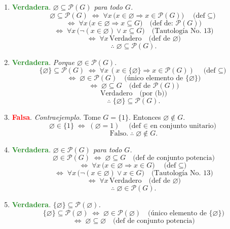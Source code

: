 \documentclass[12pt,letterpaper]{exam}
\begin{document}
\begin{enumerate}
\begin{enumerate}[label=\alph*)]
\item \textbf{\textcolor{ForestGreen}{Verdadera}}. \textit{$\varnothing \subseteq \mathcal{P}(G)$ para todo $G$.}
\[
\varnothing\subseteq \mathcal{P}(G)
\;\iff\; \forall x\,\big(x\in\varnothing \Rightarrow x\in \mathcal{P}(G)\big)
\quad\text{(def $\subseteq$)}
\]
\[
\iff\; \forall x\,\big(x\in\varnothing \Rightarrow x\subseteq G\big)
\quad\text{(def de: \(\mathcal{P}(G)\))}
\]
\[
\iff\; \forall x\,\big(\lnot(x\in\varnothing)\lor x\subseteq G\big)
\quad\text{(Tautología No.\ 13)}
\]
\[
\iff\; \forall x\,\text{Verdadero}
\quad\text{(def de $\varnothing$)}
\]
\[
\therefore\; \varnothing\subseteq \mathcal{P}(G).
\]
\item \textbf{\textcolor{ForestGreen}{Verdadera}}. \textit{Porque \(\varnothing\in\mathcal{P}(G)\)}.
\[
\{\varnothing\}\subseteq \mathcal{P}(G)
\;\iff\; \forall x\,(x\in\{\varnothing\}\Rightarrow x\in \mathcal{P}(G)) \quad\text{(def $\subseteq$)}
\]
\[
\iff\; \varnothing\in \mathcal{P}(G) \quad\text{(\'unico elemento de \(\{\varnothing\}\))}
\]
\[
\iff\; \varnothing\subseteq G \quad\text{(def de $\mathcal{P}(G)$)}
\]
\[
\text{Verdadero} \quad\text{(por (b))}
\]
\[
\therefore\; \{\varnothing\}\subseteq \mathcal{P}(G).
\]
\item \textbf{\textcolor{red}{Falsa}}. \textit{Contraejemplo}.
Tome \(G=\{1\}\). Entonces \(\varnothing\notin G\).
\[
\varnothing\in \{1\} \;\iff\; (\varnothing=1) \quad\text{(def $\in$ en conjunto unitario)}
\]
\[
\text{Falso.} \;\therefore\; \varnothing\notin G.
\]
\item \textbf{\textcolor{ForestGreen}{Verdadera}}. \textit{$\varnothing \in \mathcal{P}(G)$ para todo $G$.}
\[
\varnothing\in \mathcal{P}(G)
\;\iff\; \varnothing\subseteq G
\quad\text{(def de conjunto potencia)}
\]
\[
\iff\; \forall x\,\big(x\in\varnothing \Rightarrow x\in G\big)
\quad\text{(def $\subseteq$)}
\]
\[
\iff\; \forall x\,\big(\lnot(x\in\varnothing)\lor x\in G\big)
\quad\text{(Tautología No.\ 13)}
\]
\[
\iff\; \forall x\,\text{Verdadero}
\quad\text{(def de $\varnothing$)}
\]
\[
\therefore\; \varnothing\in \mathcal{P}(G).
\]
\item \textbf{\textcolor{ForestGreen}{Verdadera}}. \textit{$\{\varnothing\}\subseteq \mathcal{P}(\varnothing)$.}
\[
\{\varnothing\}\subseteq \mathcal{P}(\varnothing)
\;\iff\; \varnothing\in \mathcal{P}(\varnothing)
\quad\text{(único elemento de \(\{\varnothing\}\))}
\]
\[
\iff\; \varnothing\subseteq \varnothing
\quad\text{(def de conjunto potencia)}
\]
\[
\]
\end{enumerate}
\end{enumerate}
\end{document}
